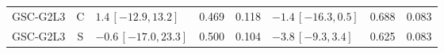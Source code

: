 \documentclass[10pt,a4paper]{article}
\begin{document}
\begin{longtable}{lcp{37mm}rrp{37mm}rr}
GSC-G2L3 & C & \(1.4\,[-12.9,13.2]\) & 0.469 & 0.118 & \(-1.4\,[-16.3,0.5]\) & 0.688 & 0.083\\
GSC-G2L3 & S & \(-0.6\,[-17.0,23.3]\) & 0.500 & 0.104 & \(-3.8\,[-9.3,3.4]\) & 0.625 & 0.083\\

\end{longtable}
\end{document}
